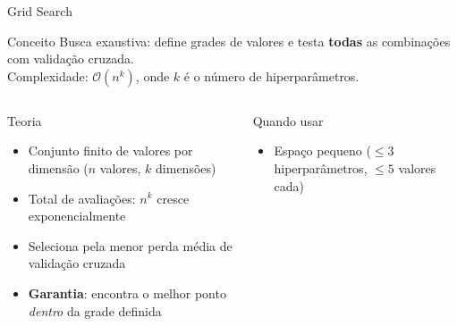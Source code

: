 \documentclass[aspectratio=169]{beamer}
\begin{document}
\begin{frame}{Grid Search}
       \begin{block}{Conceito}
            \footnotesize
            Busca exaustiva: define grades de valores e testa \textbf{todas} as combinações com validação cruzada.\\
            Complexidade: $\mathcal{O}(n^k)$, onde $k$ é o número de hiperparâmetros.
        \end{block}
    \begin{columns}
                    \footnotesize

     
        \begin{block}{Teoria}
            \begin{itemize}\footnotesize
                \item Conjunto finito de valores por dimensão ($n$ valores, $k$ dimensões)
                \item Total de avaliações: $n^k$ cresce exponencialmente
                \item Seleciona pela menor perda média de validação cruzada
                \item \textbf{Garantia}: encontra o melhor ponto \textit{dentro} da grade definida
            \end{itemize}
        \end{block}
        \begin{alertblock}{Quando usar}
            \begin{itemize}\footnotesize
                \item Espaço pequeno ($\leq 3$ hiperparâmetros, $\leq 5$ valores cada)              
            \end{itemize}
        \end{alertblock}
        \centering
\end{columns}
\end{frame}
\end{document}
